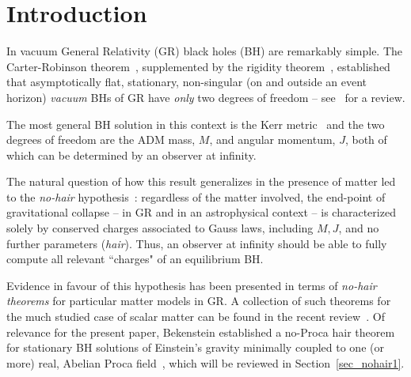


 
 \newpage

\section{Introduction}
 
In vacuum General Relativity (GR) black holes (BH) are remarkably simple. The Carter-Robinson theorem~\cite{Carter:1971zc,Robinson:1975bv}, supplemented by the rigidity theorem~\cite{Hawking:1971vc,Racz:1995nh}, established that asymptotically flat, stationary, non-singular (on and outside an event horizon)  \textit{vacuum} BHs of GR have \textit{only} 
two degrees of freedom -- see~\cite{Chrusciel:2012jk} for a review.  

The most general BH solution in this context is the Kerr metric~\cite{Kerr:1963ud} and the two degrees of freedom are the ADM mass, $M$, and angular momentum, $J$, both of which can be determined by an observer at infinity. 

The natural question of how this result generalizes in the presence of matter led to the \textit{no-hair} hypothesis~\cite{Ruffini:1971bza}: regardless of the matter involved, the end-point of gravitational collapse -- in GR and in an astrophysical context -- is characterized solely by conserved charges associated to Gauss laws, including $M,J$, and no further parameters (\textit{hair}). Thus, an observer at infinity should be able to fully compute all relevant ``charges" of an equilibrium BH.

Evidence in favour of this hypothesis has been presented in terms of \textit{no-hair theorems} for particular matter models in GR. A collection of such theorems for the much studied case of scalar matter can be found in the recent review~\cite{Herdeiro:2015waa}. Of relevance for the present paper, Bekenstein established a no-Proca hair theorem for stationary BH solutions of Einstein's gravity minimally coupled to one (or more) real, Abelian Proca field~\cite{Bekenstein:1971hc,Bekenstein:1972ky}, which will be reviewed in Section~\ref{sec_nohair1}. 



